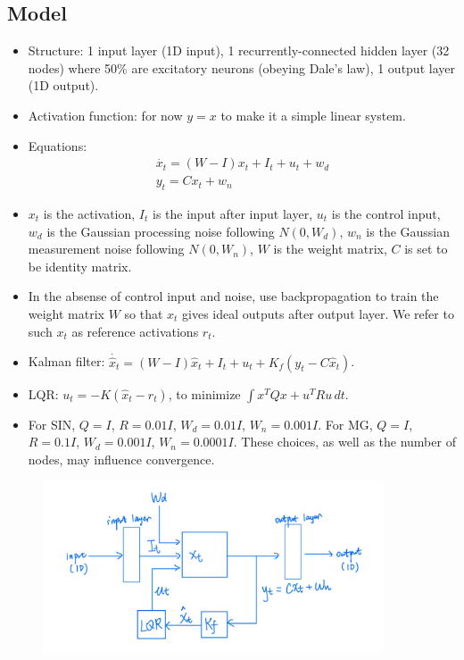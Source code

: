 \documentclass[12pt, a4paper]{article}
\begin{document}
\subsection*{Model}
\begin{itemize}
    \item Structure: 1 input layer (1D input), 1 recurrently-connected hidden layer (32 nodes) where 50\% are excitatory neurons (obeying Dale's law), 1 output layer (1D output). 

    \item Activation function: for now $y=x$ to make it a simple linear system.
    
    \item Equations: 
    \begin{eqnarray}
    \nonumber
    \dot{x_t} = (W-I)x_t + I_{t} + u_{t} + w_d \\
    \nonumber
    y_t = Cx_{t} + w_n
    \end{eqnarray}
    
    \item $x_t$ is the activation, $I_t$ is the input after input layer, $u_t$ is the control input, $w_d$ is the Gaussian processing noise following $N(0,W_d)$, $w_n$ is the Gaussian measurement noise following $N(0,W_n)$, $W$ is the weight matrix, $C$ is set to be identity matrix.

    \item In the absense of control input and noise, use backpropagation to train the weight matrix $W$ so that $x_t$ gives ideal outputs after output layer. We refer to such $x_t$ as reference activations $r_t$.

    \item Kalman filter: $\dot{\hat{x}_t} = (W-I)\hat{x}_t + I_{t} + u_{t} + K_f(y_t - C\hat{x}_t)$.
    
    \item LQR: $u_t = -K(\hat{x}_t - r_t)$, to minimize $\int x^TQx + u^TRu \,dt$.

    \item For SIN, $Q = I$, $R = 0.01I$, $W_d = 0.01I$, $W_n = 0.001I$. For MG, $Q = I$, $R = 0.1I$, $W_d = 0.001I$, $W_n = 0.0001I$. These choices, as well as the number of nodes, may influence convergence.

\end{itemize}

\begin{figure}[H]
    \centering
    \includegraphics[width=0.9\textwidth]{baseline_linear/fig/lqg_structure.jpg}
\end{figure}
\end{document}
